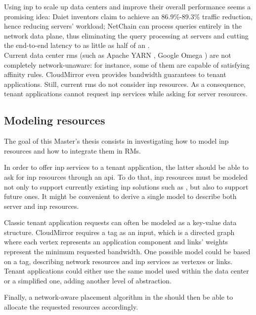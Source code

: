 Using \gls{inp} to scale up data centers and improve their overall performance seems a promising idea: Daiet \cite{daiet} inventors claim to achieve an 86.9\%-89.3\% traffic reduction, hence reducing servers' workload; NetChain \cite{netchain} can process queries entirely in the network data plane, thus eliminating the query processing at servers and cutting the end-to-end latency to as little as half of an .\\
Current data center \glspl{rm} (such as Apache YARN \cite{yarn}, Google Omega \cite{omega}) are not completely network-unaware: for instance, some of them are capable of satisfying affinity rules. CloudMirror \cite{cloudmirror} even provides bandwidth guarantees to tenant applications. Still, current \glspl{rm} do not consider \gls{inp} resources.
As a consequence, tenant applications cannot request \gls{inp} services while asking for server resources.

\subsection{Modeling \texorpdfstring{}{INP} resources}
The goal of this Master's thesis consists in investigating how to model \gls{inp} resources and how to integrate them in RMs.\par
In order to offer \gls{inp} services to a tenant application, the latter should be able to ask for \gls{inp} resources through an \gls{api}. To do that, \gls{inp} resources must be modeled not only to support currently existing \gls{inp} solutions such as \cite{daiet} \cite{netchain} \cite{incbricks} \cite{sharp}, but also to support future ones. It might be convenient to derive a single model to describe both server and \gls{inp} resources.\par
Classic tenant application requests can often be modeled as a key-value data structure. CloudMirror \cite{cloudmirror} requires a \gls{tag} as an input, which is a directed graph where each vertex represents an application component and links' weights represent the minimum requested bandwidth. One possible model could be based on a \gls{tag}, describing network resources and \gls{inp} services as vertexes or links. Tenant applications could either use the same model used within the data center or a simplified one, adding another level of abstraction.\par
{}
Finally, a network-aware placement algorithm in the  should then be able to allocate the requested resources accordingly.